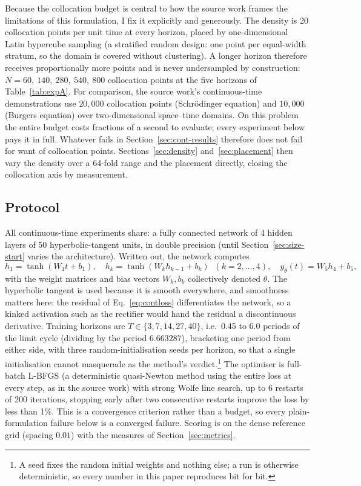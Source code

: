 \documentclass[11pt,a4paper]{article}
\begin{document}
Because the collocation budget is central to how the source work frames the
limitations of this formulation, I fix it explicitly and generously. The
density is 20 collocation points per unit time at every horizon, placed by
one-dimensional Latin hypercube sampling (a stratified random design: one
point per equal-width stratum, so the domain is covered without
clustering). A longer horizon therefore receives proportionally more
points and is never undersampled by construction:
$N = 60,\ 140,\ 280,\ 540,\ 800$ collocation points at the five horizons of
Table~\ref{tab:expA}. For comparison, the source work's continuous-time
demonstrations use $20{,}000$ collocation points (Schr\"odinger equation)
and $10{,}000$ (Burgers equation) over two-dimensional space--time domains.
On this problem the entire budget costs fractions of a second to evaluate;
every experiment below pays it in full. Whatever fails in
Section~\ref{sec:cont-results} therefore does not fail for want of
collocation points. Sections~\ref{sec:density} and~\ref{sec:placement}
then vary the density over a 64-fold range and the placement directly,
closing the collocation axis by measurement.

\subsection{Protocol}
\label{sec:cont-protocol}

All continuous-time experiments share: a fully connected network of 4
hidden layers of 50 hyperbolic-tangent units, in double precision (until
Section~\ref{sec:size-start} varies the architecture). Written out, the
network computes
\begin{equation*}
  h_1 = \tanh(W_1 t + b_1), \quad
  h_k = \tanh(W_k h_{k-1} + b_k) \;\; (k = 2, \dots, 4), \quad
  y_\theta(t) = W_5 h_4 + b_5 ,
\end{equation*}
with the weight matrices and bias vectors $W_k, b_k$ collectively
denoted $\theta$. The hyperbolic tangent is used because it is smooth
everywhere, and smoothness matters here: the residual of
Eq.~\eqref{eq:contloss} differentiates the network, so a kinked
activation such as the rectifier would hand the residual a discontinuous
derivative. Training horizons are
$T \in \{3, 7, 14, 27, 40\}$, i.e.\ 0.45 to 6.0 periods of the limit
cycle (dividing by the period $6.663287$), bracketing one period from
either side, with three
random-initialisation seeds per horizon, so that a single initialisation
cannot masquerade as the method's verdict.\footnote{A seed fixes the
random initial weights and nothing else; a run is otherwise deterministic,
so every number in this paper reproduces bit for bit.} The optimiser is
full-batch L-BFGS (a deterministic quasi-Newton method using the entire
loss at every step, as in the source work) with strong Wolfe line search,
up to 6 restarts of 200 iterations, stopping early after two consecutive
restarts improve the loss by less than 1\%. This is a convergence
criterion rather than a budget, so every plain-formulation failure below
is a converged failure. Scoring is on the dense reference grid (spacing
$0.01$) with the measures of Section~\ref{sec:metrics}.
\end{document}
